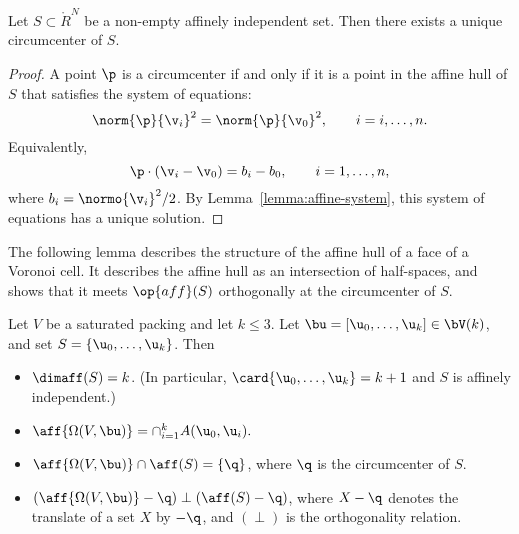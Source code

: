 \begin{lemma} 
  Let $S\subset \ring{R}^N$ be a non-empty affinely independent set.
  Then there exists a unique circumcenter of $S$.
\end{lemma}

\begin{proof} 
  A point $\p$ is a circumcenter if and only if it is a point in the
  affine hull of $S$ that satisfies the system of equations:
\begin{displaymath} 
\norm{\p}{\v_i}^2 = \norm{\p}{\v_0}^2,\qquad i = i,\ldots,n.
\end{displaymath}
Equivalently,
\begin{displaymath} 
\p\cdot (\v_i-\v_0) = b_i-b_0,\qquad i=1,\ldots,n,
\end{displaymath}
where $b_i = \normo{\v_i}^2/2$.  By
Lemma~\ref{lemma:affine-system}, this system of equations has a unique
solution.
\end{proof}

The following lemma describes the structure of the affine hull of a
face of a Voronoi cell.  It describes the affine hull as an intersection of half-spaces,
and shows that it meets $\op{aff}(S)$ orthogonally at the circumcenter of $S$.

\begin{lemma}[]\label{lemma:aff-center} 
Let $V$ be a saturated packing and let $k\le 3$.
Let $\bu=[\u_0,\ldots,\u_k]\in \bV(k)$, and set $S = \{\u_0,\ldots,\u_k\}$.
Then
\begin{itemize} 
\item $\dimaff (S)= k$.  (In particular, $\card\{\u_0,\ldots,\u_k\}=k+1$ and
$S$ is affinely independent.)
\item $\aff{\Omega(V,\bu)}= \cap_{i=1}^k A(\u_0,\u_i).$
\item $\aff{\Omega(V,\bu)} \cap \aff(S) = \{\q\}$, 
where $\q$ is the circumcenter of $S$.
\item $(\aff{\Omega(V,\bu)}-\q) \perp (\aff(S)-\q)$, where
  $X-\q$ denotes the translate of a set $X$ by $-\q$, and $(\perp)$ is
  the orthogonality relation.
\end{itemize}
\end{lemma}


